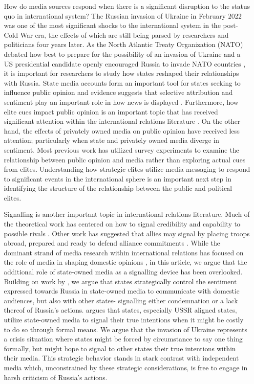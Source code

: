 \documentclass[12pt]{article}
\begin{document}
How do media sources respond when there is a significant disruption to the status quo in international system? The Russian invasion of Ukraine in February 2022 was one of the most significant shocks to the international system in the post-Cold War era, the effects of which are still being parsed by researchers and politicians four years later. As the North Atlantic Treaty Organization (NATO) debated how best to prepare for the possibility of an invasion of Ukraine \citep{jakes_for_2024} and a US presidential candidate openly encouraged Russia to invade NATO countries \citep{sanger_outburst_2024}, it is important for researchers to study how states reshaped their relationships with Russia. State media accounts form an important tool for states seeking to influence public opinion \citep{guriev_theory_2020} and evidence suggests that selective attribution and sentiment play an important role in how news is displayed \citep{rozenas_how_2019}. Furthermore, how elite cues impact public opinion is an important topic that has received significant attention within the international relations literature \citep{guisinger_mapping_2017}. On the other hand, the effects of privately owned media on public opinion have received less attention; particularly when state and privately owned media diverge in sentiment. Most previous work has utilized survey experiments to examine the relationship between public opinion and media rather than exploring actual cues from elites. Understanding how strategic elites utilize media messaging to respond to significant events in the international sphere is an important next step in identifying the structure of the relationship between the public and political elites. 

Signalling is another important topic in international relations literature. Much of the theoretical work has centered on how to signal credibility and capability to possible rivals \citep{fearon_signaling_1997}. Other work has suggested that allies may signal by placing troops abroad, prepared and ready to defend alliance commitments \citep{blankenship_trivial_2022}. While the dominant strand of media research within international relations has focused on the role of media in shaping domestic opinions \citep{mccombs_agenda-setting_2002, gershkoff_shaping_2005}, in this article, we argue that the additional role of state-owned media as a signalling device has been overlooked. Building on work by \citet{cohen_theatre_1987}, we argue that states strategically control the sentiment expressed towards Russia in state-owned media to communicate with domestic audiences, but also with other states- signalling either condemnation or a lack thereof of Russia's actions. \citet{cohen_theatre_1987} argues that states, especially USSR aligned states, utilize state-owned media to signal their true intentions when it might be costly to do so through formal means. We argue that the invasion of Ukraine represents a crisis situation where states might be forced by circumstance to say one thing formally, but might hope to signal to other states their true intentions within their media. This strategic behavior stands in stark contrast with independent media which, unconstrained by these strategic considerations, is free to engage in harsh criticism of Russia's actions.
\end{document}
